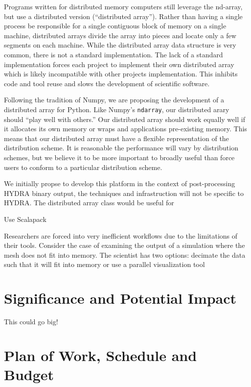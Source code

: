 \documentclass[a4paper]{article}
\begin{document}
Programs written for distributed memory computers still leverage the nd-array, but use a distributed version (``distributed array'').  Rather than having a single process be responsible for a single contiguous block of memory on a single machine, distributed arrays divide the array into pieces and locate only a few segments on each machine.  While the distributed array data structure is very common, there is not a standard implementation.  The lack of a standard implementation forces each project to implement their own distributed array which is likely incompatible with other projects implementation.  This inhibits code and tool reuse and slows the development of scientific software.

Following the tradition of Numpy, we are proposing the development of a distributed array for Python.  Like Numpy's \texttt{ndarray}, our distributed arary should ``play well with others.''  Our distributed array should work equally well if it allocates its own memory or wraps and applications pre-existing memory.  This means that our distributed array must have a flexible representation of the distribution scheme.  It is reasonable the performance will vary by distribution schemes, but we believe it to be more important to broadly useful than force users to conform to a particular distribution scheme.

We initially propse to develop this platform in the context of post-processing HYDRA binary output, the techniques and infrastruction will not be specific to HYDRA\@.  The distributed array class would be useful for 

Use Scalapack

Researchers are forced into very inefficient workflows due to the limitations of their tools.  Consider the case of examining the output of a simulation where the mesh does not fit into memory.  The scientist has two options: decimate the data such that it will fit into memory or use a parallel visualization tool



\section*{Significance and Potential Impact}
This could go big!

\section*{Plan of Work, Schedule and Budget}
\end{document}
